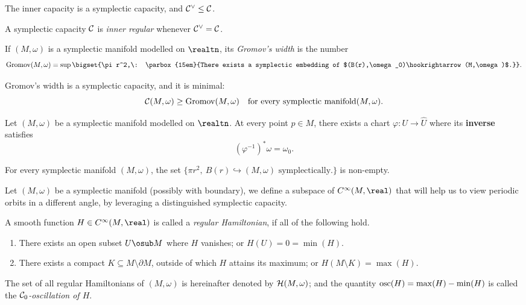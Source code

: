 \documentclass[../main-v2-manifolds.tex]{subfiles}
\begin{document}
\begin{wts}
    The inner capacity is a symplectic capacity, and $\mathcal{C}^\vee\leq \mathcal{C}$.
\end{wts}
\begin{definition}
    A symplectic capacity $\mathcal{C}$ is \emph{inner regular} whenever $\mathcal{C}^\vee = \mathcal{C}$.
\end{definition}
\begin{definition}
    If $(M,\omega)$ is a symplectic manifold modelled on $\realtn$, its \emph{Gromov's width} is the number 
    \[
        \Grom(M,\omega) = \sup\bigset{\pi r^2,\: \parbox{15em}{There exists a symplectic embedding of $(B(r),\omega_0)\hookrightarrow (M,\omega)$.}}.
    \]
\end{definition}
\begin{wts}
    Gromov's width is a symplectic capacity, and it is minimal:
    \[
        \mathcal{C}(M,\omega)\geq \mathrm{Gromov}(M,\omega)\quad\text{for every symplectic manifold} (M,\omega).
    \]
\end{wts}
\begin{wts}\label{wts:darbouxs theorem}
    Let $(M,\omega)$ be a symplectic manifold modelled on $\realtn$. At every point $p\in M$, there exists a chart $\varphi: U\to\hat{U}$ where its \textbf{inverse} satisfies
    \[
        (\varphi^{-1})^*\omega = \omega_0.
    \]
\end{wts}
\begin{corollary}
    For every symplectic manifold $(M,\omega)$, the set $\{\pi r^2, \: B(r)\hookrightarrow (M,\omega) \text{ symplectically.}\}$ is non-empty.
\end{corollary}
Let $(M,\omega)$ be a symplectic manifold (possibly with boundary), we define a subspace of $C^\infty(M,\real)$ that will help us to view periodic orbits in a different angle, by leveraging a distinguished symplectic capacity. 
\begin{definition}\label{def:regular hamiltonians}
    A smooth function $H\in C^\infty(M,\real)$ is called a \emph{regular Hamiltonian}, if all of the following hold.
    \begin{enumerate}
        \item There exists an open subset $U\osub M$ where $H$ vanishes; or $H(U) = 0=\min(H)$.
        \item There exists a compact $K\subseteq M\setminus \partial M$, outside of which $H$ attains its maximum; or $H(M\setminus K) = \max(H)$.
    \end{enumerate}
    The set of all regular Hamiltonians of $(M,\omega)$ is hereinafter denoted by $\mathcal{H}(M,\omega)$; and the quantity $\mathrm{osc}(H) = \max(H) - \min(H)$ is called the \emph{$\mathcal{C}_0$-oscillation of $H$}.
\end{definition}
\end{document}
